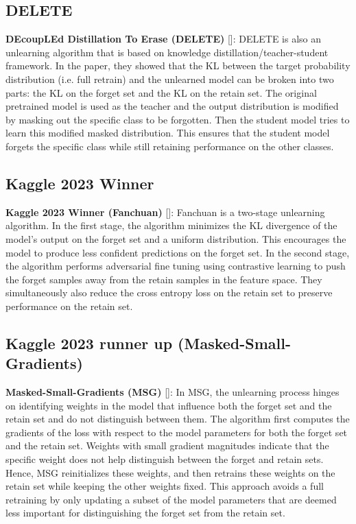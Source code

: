 \documentclass{article}
\begin{document}
\subsection{DELETE}
\textbf{DEcoupLEd Distillation To Erase (DELETE)} [\cite{zhou2025decoupleddistillationerasegeneral}]: DELETE is also an unlearning algorithm that is based on knowledge distillation/teacher-student framework. In the paper, they showed that the KL between the target probability distribution (i.e. full retrain) and the unlearned model can be broken into two parts: the KL on the forget set and the KL on the retain set. The original pretrained model is used as the teacher and the output distribution is modified by masking out the specific class to be forgotten. Then the student model tries to learn this modified masked distribution. 
This ensures that the student model forgets the specific class while still retaining performance on the other classes. 

 
\subsection{Kaggle 2023 Winner}
\textbf{Kaggle 2023 Winner (Fanchuan)} [\cite{2023-winner}]: Fanchuan is a two-stage unlearning algorithm. In the first stage, the algorithm minimizes the KL divergence of the model's output on the forget set and a uniform distribution. This encourages the model to produce less confident predictions on the forget set. In the second stage, the algorithm performs adversarial fine tuning using contrastive learning to push the forget samples away from the retain samples in the feature space. They simultaneously also reduce the cross entropy loss on the retain set to preserve performance on the retain set. 

\subsection{Kaggle 2023 runner up (Masked-Small-Gradients)}
\textbf{Masked-Small-Gradients (MSG)} [\cite{2023-second-place}]: In MSG, the unlearning process hinges on identifying weights in the model that influence both the forget set and the retain set and do not distinguish between them. The algorithm first computes the gradients of the loss with respect to the model parameters for both the forget set and the retain set. Weights with small gradient magnitudes indicate that the specific weight 
does not help distinguish between the forget and retain sets. Hence, MSG reinitializes these weights, and then retrains these weights on the retain set while keeping the other weights fixed. This approach avoids a full retraining by only updating a subset of the model parameters that are deemed less important for distinguishing the forget set from the retain set.
\end{document}
